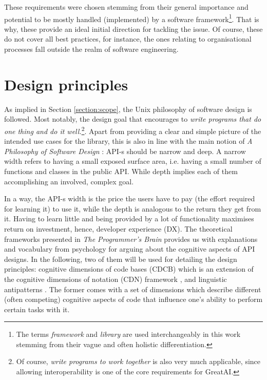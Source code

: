 These requirements were chosen stemming from their general importance and potential to be mostly handled (implemented) by a software framework\footnote{The terms \textit{framework} and \textit{library} are used interchangeably in this work stemming from their vague and often holistic differentiation.}. That is why, these provide an ideal initial direction for tackling the issue. Of course, these do not cover all best practices, for instance, the ones relating to organisational processes fall outside the realm of software engineering.

\section{Design principles}

As implied in Section \ref{section:scope}, the Unix philosophy \cite{ritchie1978unix,salus1994quarter} of software design is followed. Most notably, the design goal that encourages to \textit{write programs that do one thing and do it well.}\footnote{Of course, \textit{write programs to work together} is also very much applicable, since allowing interoperability is one of the core requirements for GreatAI.}. Apart from providing a clear and simple picture of the intended use cases for the library, this is also in line with the main notion of \textit{A Philosophy of Software Design} \cite{ousterhout2018philosophy}: API-s should be narrow and deep. A narrow width refers to having a small exposed surface area, i.e. having a small number of functions and classes in the public API. While depth implies each of them accomplishing an involved, complex goal. 

In a way, the API-s width is the price the users have to pay (the effort required for learning it) to use it, while the depth is analogous to the return they get from it. Having to learn little and being provided by a lot of functionality maximises return on investment, hence, developer experience (DX). The theoretical frameworks presented in \textit{The Programmer's Brain} \cite{hermans2021programmer} provides us with explanations and vocabulary from psychology for arguing about the cognitive aspects of API designs. In the following, two of them will be used for detailing the design principles: cognitive dimensions of code bases (CDCB) which is an extension of the cognitive dimensions of notation (CDN) framework \cite{blackwell2001cognitive}, and linguistic antipatterns \cite{arnaoudova2016linguistic}. The former comes with a set of dimensions which describe different (often competing) cognitive aspects of code that influence one's ability to perform certain tasks with it.

